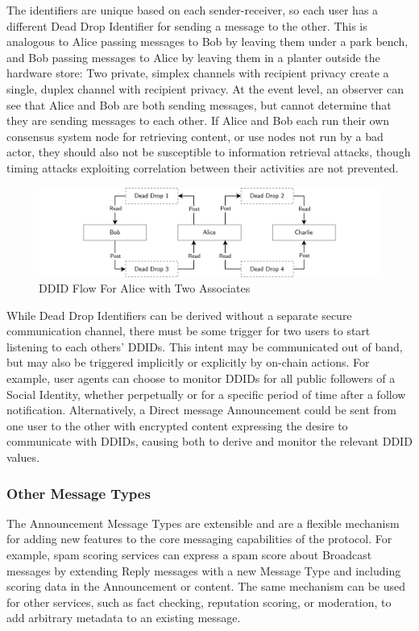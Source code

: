 \documentclass[12pt,letterpaper]{article}
\begin{document}
The identifiers are unique based on each sender-receiver, so each user has a different Dead
Drop Identifier for sending a message to the other. This is analogous to Alice passing
messages to Bob by leaving them under a park bench, and Bob passing messages to Alice by
leaving them in a planter outside the hardware store: Two private, simplex channels with
recipient privacy create a single, duplex channel with recipient privacy. At the event
level, an observer can see that Alice and Bob are both sending messages, but cannot
determine that they are sending messages to each other. If Alice and Bob each run their own
consensus system node for retrieving content, or use nodes not run by a bad actor, they
should also not be susceptible to information retrieval attacks, though timing attacks
exploiting correlation between their activities are not prevented.

\begin{figure}
	\includegraphics[width=\linewidth]{figures/DDID Flow For Alice with Two Associates.png}
	\caption{DDID Flow For Alice with Two Associates}
	\label{fig:7}
\end{figure}

While Dead Drop Identifiers can be derived without a separate secure communication channel,
there must be some trigger for two users to start listening to each others' DDIDs. This
intent may be communicated out of band, but may also be triggered implicitly or explicitly
by on-chain actions. For example, user agents can choose to monitor DDIDs for all public
followers of a Social Identity, whether perpetually or for a specific period of time after a
follow notification. Alternatively, a Direct message Announcement could be sent from one
user to the other with encrypted content expressing the desire to communicate with DDIDs,
causing both to derive and monitor the relevant DDID values.

\subsubsection{Other Message Types}

The Announcement Message Types are extensible and are a flexible mechanism for adding new
features to the core messaging capabilities of the protocol. For example, spam scoring
services can express a spam score about Broadcast messages by extending Reply messages with
a new Message Type and including scoring data in the Announcement or content. The same
mechanism can be used for other services, such as fact checking, reputation scoring, or
moderation, to add arbitrary metadata to an existing message.
\end{document}

